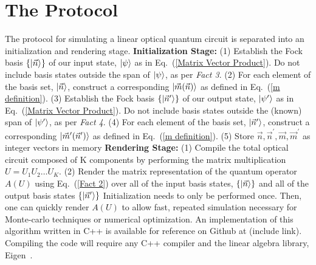 \documentclass[aps,pra,twocolumn,showpacs,superscriptaddress,floatfix,10pt]{revtex4}
\begin{document}
\section{The Protocol}
\label{Section on Protocol}
\noindent The protocol for simulating a linear optical quantum circuit is separated into an initialization and rendering stage.
\newline
\newline
\textbf{Initialization Stage:}
\newline
\newline
		(1)  Establish the Fock basis $\{\ket{\vec{n}} \}$ of our input state, $\ket{\psi}$ as in Eq.~(\ref{Matrix Vector Product}). Do not include basis states outside the span of $\ket{\psi}$, as per \textit{Fact 3}.
		\newline
		\newline
		(2) For each element of the basis set, $\ket{\vec{n}}$, construct a corresponding $\ket{\vec{m}(\vec{n})}$ as defined in Eq.~(\ref{m definition}).
		\newline
		\newline
		(3) Establish the Fock basis $\{\ket{\vec{n}^\prime}\}$ of our output state, $\ket{\psi^\prime}$ as in Eq.~(\ref{Matrix Vector Product}). Do not include basis states outside the (known) span of $\ket{\psi^\prime}$, as per \textit{Fact 4}.
		\newline
		\newline
		(4)  For each element of the basis set, $\ket{\vec{n}^\prime}$, construct a corresponding $\ket{\vec{m}^\prime(\vec{n}^\prime)}$ as defined in Eq.~(\ref{m definition}).
		\newline
		\newline
		(5) Store $\vec{n}, \vec{n}^\prime, \vec{m}, \vec{m}^\prime$ as integer vectors in memory
		\newline
		\newline
\textbf{Rendering Stage:}
\newline
\newline
		(1)  Compile the total optical circuit composed of K components by performing the matrix multiplication $ U = U_1 U_2 \dots U_K $.
		\newline
		\newline
		(2) Render the matrix representation of the quantum operator $A(U)$ using Eq.~(\ref{Fact 2}) over all of the input basis states, $\{\ket{\vec{n}}\}$ and all of the output basis states $\{\ket{\vec{n}^\prime}\}$
\newline
\newline
Initialization needs to only be performed once. Then, one can quickly render $A(U)$ to allow fast, repeated simulation necessary for Monte-carlo techniques or numerical optimization.
\newline
\newline
An implementation of this algorithm written in C++ is available for reference on Github at (include link). Compiling the code will require any C++ compiler and the linear algebra library, Eigen~\cite{EIGEN}.
\end{document}
